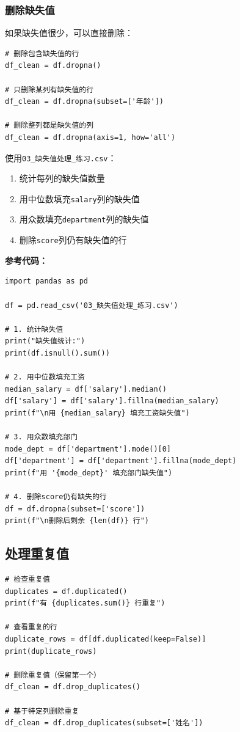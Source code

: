 \documentclass[12pt,a4paper]{article}
\begin{document}
\subsubsection{删除缺失值}

如果缺失值很少，可以直接删除：

\begin{lstlisting}[caption={删除缺失值}]
# 删除包含缺失值的行
df_clean = df.dropna()

# 只删除某列有缺失值的行
df_clean = df.dropna(subset=['年龄'])

# 删除整列都是缺失值的列
df_clean = df.dropna(axis=1, how='all')
\end{lstlisting}

\begin{practicebox}[动手练习4]
使用\texttt{03\_缺失值处理\_练习.csv}：

\begin{enumerate}
    \item 统计每列的缺失值数量
    \item 用中位数填充\texttt{salary}列的缺失值
    \item 用众数填充\texttt{department}列的缺失值
    \item 删除\texttt{score}列仍有缺失值的行
\end{enumerate}

\textbf{参考代码：}
\begin{lstlisting}
import pandas as pd

df = pd.read_csv('03_缺失值处理_练习.csv')

# 1. 统计缺失值
print("缺失值统计:")
print(df.isnull().sum())

# 2. 用中位数填充工资
median_salary = df['salary'].median()
df['salary'] = df['salary'].fillna(median_salary)
print(f"\n用 {median_salary} 填充工资缺失值")

# 3. 用众数填充部门
mode_dept = df['department'].mode()[0]
df['department'] = df['department'].fillna(mode_dept)
print(f"用 '{mode_dept}' 填充部门缺失值")

# 4. 删除score仍有缺失的行
df = df.dropna(subset=['score'])
print(f"\n删除后剩余 {len(df)} 行")
\end{lstlisting}
\end{practicebox}

\subsection{处理重复值}

\begin{lstlisting}[caption={处理重复值}]
# 检查重复值
duplicates = df.duplicated()
print(f"有 {duplicates.sum()} 行重复")

# 查看重复的行
duplicate_rows = df[df.duplicated(keep=False)]
print(duplicate_rows)

# 删除重复值（保留第一个）
df_clean = df.drop_duplicates()

# 基于特定列删除重复
df_clean = df.drop_duplicates(subset=['姓名'])
\end{lstlisting}
\end{document}

